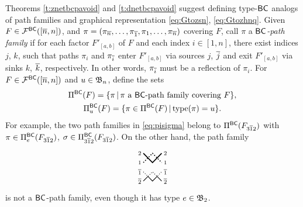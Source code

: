 \documentclass[11pt]{article}
\theoremstyle{definition}
\numberwithin{equation}{section}
\begin{document}
Theorems \ref{t:znetbcpavoid}
and \ref{t:dnetbcpavoid} suggest defining
type-$\mathsf{BC}$ analogs of path families and graphical representation
\eqref{eq:Gtozsn}, \eqref{eq:Gtozhnq}.
Given $F \in \mathcal F^{\mathsf{BC}}([\overline{n},n])$,
and
$\pi=(\pi_{\overline{n}}, \dotsc, \pi_{\overline{1}}, \pi_1, \dotsc, \pi_{\overline{n}})$
covering $F$, call $\pi$ a {\em $\mathsf{BC}$-path family} if
for each factor $F'_{[a,b]}$ of $F$
and each index $i \in [1,n]$, there exist indices $j$, $k$, such that
paths $\pi_i$ and $\pi_{\overline{i}}$ enter $F'_{[a,b]}$ via sources $j$, $\overline{j}$
and exit $F'_{[a,b]}$ via sinks $k$, $\overline{k}$, respectively.
In other words, $\pi_{\overline{i}}$ must be a reflection of $\pi_i$.
For $F \in \mathcal F^{\mathsf{BC}}([\overline{n},n])$ and $u \in \mathfrak{B}_n$, define the sets
\begin{equation}\label{eq:BCpathfams}
  \begin{gathered}
    \PiBC(F) = \{ \pi \,|\, \pi \text{ a $\msfBC$-path family covering } F \},\\
    \PiBC_u(F) = \{ \pi \in \PiBC(F) \,|\, \type(\pi) = u \}.
    \end{gathered}
\end{equation}
For example, the two path families in \eqref{eq:pisigma}
belong to
$\Pi^{\mathsf{BC}}(F_{3\overline{1}2})$ with
$\pi \in \Pi^{\mathsf{BC}}_e(F_{3\overline{1}2})$, $\sigma \in \Pi^{\mathsf{BC}}_{3\overline{1}2}(F_{3\overline{1}2})$.
On the other hand,
the path family
\begin{equation}\label{eq:notBCpathfam}
\begin{tikzpicture}[scale=.4,baseline=0]%
  \node at (-1.4,1.5) {$\scriptstyle 2$};
  \node at (-1.4,0.5) {$\scriptstyle 1$};
  \node at (1.4,1.5) {$\scriptstyle 2$};
  \node at (1.4,0.5) {$\scriptstyle 1$};
  \node at (-1.4,-1.5) {$\scriptstyle {\ol 2}$};
  \node at (-1.4,-0.5) {$\scriptstyle {\ol 1}$};
  \node at (1.4,-1.5) {$\scriptstyle {\ol 2}$};
  \node at (1.4,-0.5) {$\scriptstyle {\ol 1}$};
  \draw[-, very thick]
  (-1,1.5) -- (0,.5) -- (1,1.5);
  \draw[-, dotted, very thick]
  (-1,0.5) -- (0,1.5) -- (1,0.5);
  \draw[-, dotted, thick ]
  (-1,-0.5) -- (-.5,-1) -- (0,-.5) -- (.5,-1) -- (1,-0.5);
  \draw[-, thick]
  (-1,-1.5) -- (-.5,-1) -- (0,-1.5) -- (.5,-1) -- (1,-1.5);
\end{tikzpicture}
\end{equation}
is not a $\mathsf{BC}$-path family,
even though it has type $e \in \mathfrak{B}_{2}$.
\end{document}
